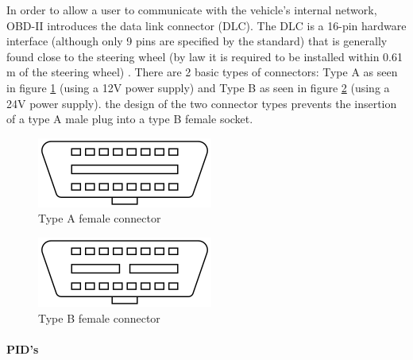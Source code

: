 \documentclass[11pt]{article}
\begin{document}
In order to allow a user to communicate with the vehicle's internal network, OBD-II introduces the data link connector (DLC). The DLC is a 16-pin hardware interface (although only 9 pins are specified by the standard) that is generally found close to the steering wheel (by law it is required to be installed within 0.61 m of the steering wheel) \cite{ODBwiki}. There are 2 basic types of connectors: Type A as seen in figure \ref{fig:typeA} (using a 12V power supply) and Type B as seen in figure \ref{fig:typeB} (using a 24V power supply). the design of the two connector types prevents the insertion of a type A male plug into a type B female socket.

\begin{figure}[h]
	\label{fig:typeA}
	\centering
	\includegraphics{typeA.png}
	\caption{Type A female connector \cite{ODBwiki}}
\end{figure}

\begin{figure}[h]
	\label{fig:typeB}
	\centering
	\includegraphics{typeB.png}
	\caption{Type B female connector \cite{ODBwiki}}
\end{figure}

\paragraph{PID's}
\end{document}
